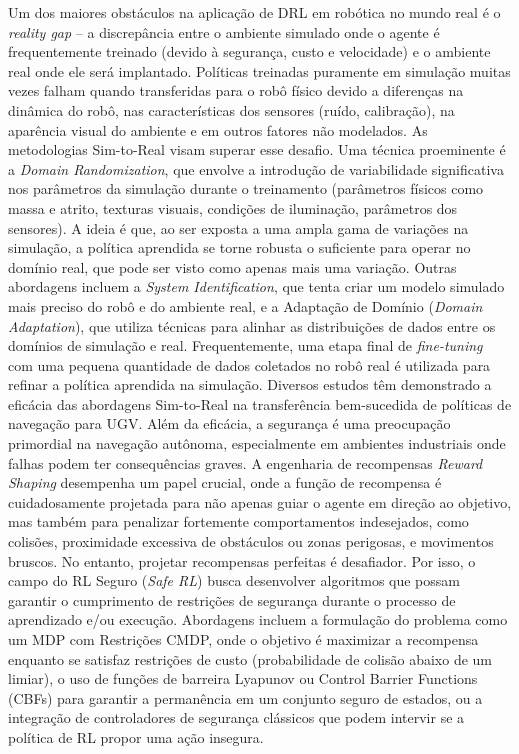 Um dos maiores obstáculos na aplicação de \ac{DRL} em robótica no mundo real é o \textit{reality gap} – a discrepância entre o ambiente simulado onde o agente é frequentemente treinado (devido à segurança, custo e velocidade) e o ambiente real onde ele será implantado. Políticas treinadas puramente em simulação muitas vezes falham quando transferidas para o robô físico devido a diferenças na dinâmica do robô, nas características dos sensores (ruído, calibração), na aparência visual do ambiente e em outros fatores não modelados. As metodologias Sim-to-Real visam superar esse desafio. Uma técnica proeminente é a \textit{Domain Randomization}, que envolve a introdução de variabilidade significativa nos parâmetros da simulação durante o treinamento (parâmetros físicos como massa e atrito, texturas visuais, condições de iluminação, parâmetros dos sensores). A ideia é que, ao ser exposta a uma ampla gama de variações na simulação, a política aprendida se torne robusta o suficiente para operar no domínio real, que pode ser visto como apenas mais uma variação. Outras abordagens incluem a \textit{System Identification}, que tenta criar um modelo simulado mais preciso do robô e do ambiente real, e a Adaptação de Domínio (\textit{Domain Adaptation}), que utiliza técnicas para alinhar as distribuições de dados entre os domínios de simulação e real. Frequentemente, uma etapa final de \textit{fine-tuning} com uma pequena quantidade de dados coletados no robô real é utilizada para refinar a política aprendida na simulação. Diversos estudos têm demonstrado a eficácia das abordagens Sim-to-Real na transferência bem-sucedida de políticas de navegação para \ac{UGV}.
Além da eficácia, a segurança é uma preocupação primordial na navegação autônoma, especialmente em ambientes industriais onde falhas podem ter consequências graves. A engenharia de recompensas \textit{Reward Shaping} desempenha um papel crucial, onde a função de recompensa é cuidadosamente projetada para não apenas guiar o agente em direção ao objetivo, mas também para penalizar fortemente comportamentos indesejados, como colisões, proximidade excessiva de obstáculos ou zonas perigosas, e movimentos bruscos. No entanto, projetar recompensas perfeitas é desafiador. Por isso, o campo do \ac{RL} Seguro (\textit{Safe RL}) busca desenvolver algoritmos que possam garantir o cumprimento de restrições de segurança durante o processo de aprendizado e/ou execução. Abordagens incluem a formulação do problema como um \ac{MDP} com Restrições \ac{CMDP}, onde o objetivo é maximizar a recompensa enquanto se satisfaz restrições de custo (probabilidade de colisão abaixo de um limiar), o uso de funções de barreira Lyapunov ou Control Barrier Functions (CBFs) para garantir a permanência em um conjunto seguro de estados, ou a integração de controladores de segurança clássicos que podem intervir se a política de \ac{RL} propor uma ação insegura.
